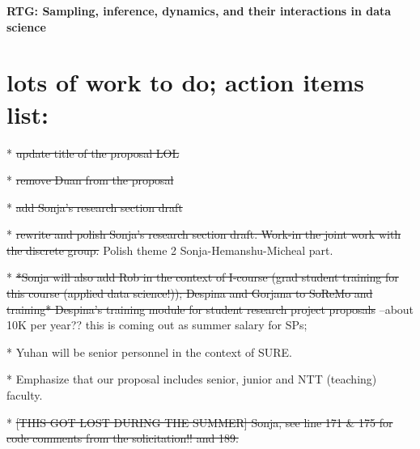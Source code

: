 \documentclass[11pt]{NSFamsart}
\begin{document}
  

\centerline{\large \textbf{RTG: Sampling, inference,  dynamics, and their interactions in data science}}

\section*{\color{magenta}lots of work to do; action items list:}

\begin{comment}
{\color{magenta}BUDGET NOTES: \\
* 5 postdocs (hire 2 in 1st year, 1 in 2nd year, 2 in 3rd year); \\
* 1-2 weeks summer salary for one PI per year - Chun in year1, others rotate after;\\
* PhD: 2 per year = total 10;\\
* undergrads: 6 per year -- this includes SoReMo fellows FROM MATH (AY UG); plus SURE (SUmmer UG); \\
* Rob's I-course funding for students - TA grad student training for this course (applied data science!);\\
* Despina's training module for student research project proposals --about 10K per year; \\
* ... 
}
\end{comment}

* \sout{update title of the proposal LOL} 

* \sout{remove Duan from the proposal}

* \sout{add Sonja's research section draft}

* \sout{rewrite and polish Sonja's research section draft.  Work-in the joint work with the discrete group.} Polish theme 2 Sonja-Hemanshu-Micheal part.

* \sout{*Sonja will also add Rob in the context of I-course (grad student training for this course (applied data science!)); Despina and Gorjana to SoReMo and training* Despina's training module for student research project proposals } --about 10K per year?? this is coming out as summer salary for SPs;

* Yuhan will be senior personnel in the context of SURE. 

* Emphasize that our proposal includes senior, junior and NTT (teaching) faculty. 

* \sout{[THIS GOT LOST DURING THE SUMMER] Sonja, see line 171 \& 175 for code comments from the solicitation!!  and 189.}
\end{document}
